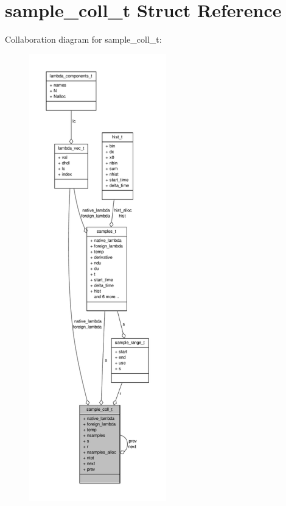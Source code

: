 \hypertarget{structsample__coll__t}{\section{sample\-\_\-coll\-\_\-t \-Struct \-Reference}
\label{structsample__coll__t}
}


\-Collaboration diagram for sample\-\_\-coll\-\_\-t\-:
\nopagebreak
\begin{figure}[H]
\begin{center}
\leavevmode
\includegraphics[height=550pt]{structsample__coll__t__coll__graph}
\end{center}
\end{figure}
